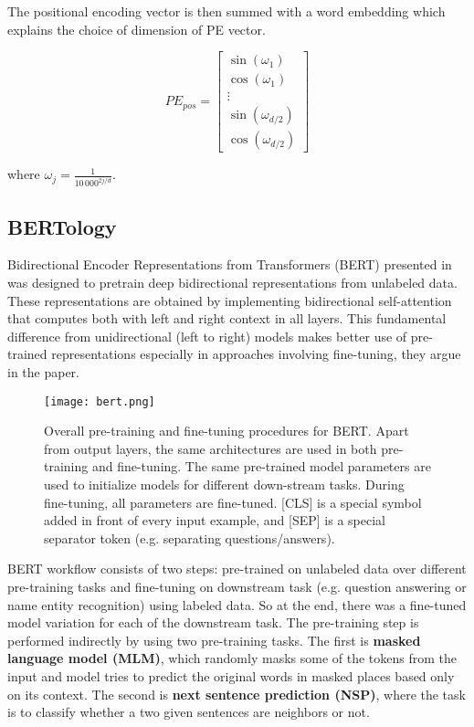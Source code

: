     \noindent The positional encoding vector is then summed with a word embedding which explains the choice of dimension of PE vector.~\parencite{vaswani2017attention}
    
    \[
    PE_{pos} =
    \begin{bmatrix}
       \sin(\omega_{1}) \\ \cos(\omega_{1})  \\  \vdots \\ \sin(\omega_{d/2}) \\ \cos(\omega_{d/2})
    \end{bmatrix}
    \] 
    
    where $\omega_{j} = \frac{1}{10\,000^{2j / d}}$.

\subsection{BERTology}
\label{section:bertology}
    Bidirectional Encoder Representations from Transformers (BERT) presented in~\parencite{devlin2018bert} was designed to pretrain deep bidirectional representations from unlabeled data. These representations are obtained by implementing bidirectional self-attention that computes both with left and right context in all layers. This fundamental difference from unidirectional (left to right) models makes better use of pre-trained representations especially in approaches involving fine-tuning, they argue in the paper.
    
    \begin{figure}[H]
        \texttt{[image: bert.png]}
        \centering
        \caption[Pre-training and fine-tuning procedures for BERT]{Overall pre-training and fine-tuning procedures for BERT. Apart from output layers, the same architectures are used in both pre-training and fine-tuning. The same pre-trained model parameters are used to initialize models for different down-stream tasks. During fine-tuning, all parameters are fine-tuned. [CLS] is a special symbol added in front of every input example, and [SEP] is a special separator token (e.g. separating questions/answers).~\parencite{devlin2018bert}}
        \label{fig:bert}
    \end{figure}
    
    BERT workflow consists of two steps: pre-trained on unlabeled data over different pre-training tasks and fine-tuning on downstream task (e.g. question answering or name entity recognition) using labeled data. So at the end, there was a fine-tuned model variation for each of the downstream task. The pre-training step is performed indirectly by using two pre-training tasks. The first is \textbf{masked language model (MLM)}, which randomly masks some of the tokens from the input and model tries to predict the original words in masked places based only on its context. The second is \textbf{next sentence prediction (NSP)}, where the task is to classify whether a two given sentences are neighbors or not.~\parencite{devlin2018bert} 
    
